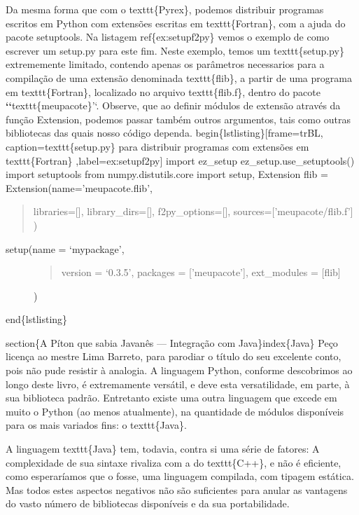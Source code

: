 \documentclass[a4paper,10pt,brazil]{sphinxmanual}
\begin{document}
Da mesma forma que com o texttt\{Pyrex\}, podemos distribuir programas escritos em Python com extensões escritas em texttt\{Fortran\}, com a ajuda do pacote setuptools. Na listagem ref\{ex:setupf2py\} vemos o exemplo de como escrever um setup.py para este fim. Neste exemplo, temos um texttt\{setup.py\} extrememente limitado, contendo apenas os parâmetros necessarios para a compilação de uma extensão denominada texttt\{flib\}, a partir de uma programa em texttt\{Fortran\}, localizado no arquivo texttt\{flib.f\}, dentro do pacote {\color{red}\bfseries{}{}`{}`}texttt\{meupacote\}'`. Observe, que ao definir módulos de extensão através da função Extension, podemos passar também outros argumentos, tais como outras bibliotecas das quais nosso código dependa.
begin\{lstlisting\}{[}frame=trBL, caption=texttt\{setup.py\} para distribuir programas com extensões em texttt\{Fortran\} ,label=ex:setupf2py{]}
import ez\_setup
ez\_setup.use\_setuptools()
import setuptools
from numpy.distutils.core import setup, Extension
flib = Extension(name='meupacote.flib',
\begin{quote}

libraries={[}{]},
library\_dirs={[}{]},
f2py\_options={[}{]},
sources={[}'meupacote/flib.f'{]}
)
\end{quote}
\begin{description}
\item[{setup(name = `mypackage',}] \leavevmode\begin{quote}

version = `0.3.5',
packages = {[}'meupacote'{]},
ext\_modules = {[}flib{]}
\end{quote}

)

\end{description}

end\{lstlisting\}

section\{A Píton que sabia Javanês --- Integração com Java\}index\{Java\}
Peço licença ao mestre Lima Barreto, para parodiar o título do seu excelente conto, pois não pude resistir à analogia. A linguagem Python, conforme descobrimos ao longo deste livro, é extremamente versátil, e deve esta versatilidade, em parte, à sua biblioteca padrão. Entretanto existe uma outra linguagem que excede em muito o Python (ao menos atualmente), na quantidade de módulos disponíveis para os mais variados fins: o texttt\{Java\}.

A linguagem texttt\{Java\} tem, todavia, contra si uma série de fatores: A complexidade de sua sintaxe rivaliza com a do texttt\{C++\}, e não é eficiente, como esperaríamos que o fosse, uma linguagem compilada, com tipagem estática. Mas todos estes aspectos negativos não são suficientes para anular as vantagens do vasto número de bibliotecas disponíveis e da sua portabilidade.
\end{document}

